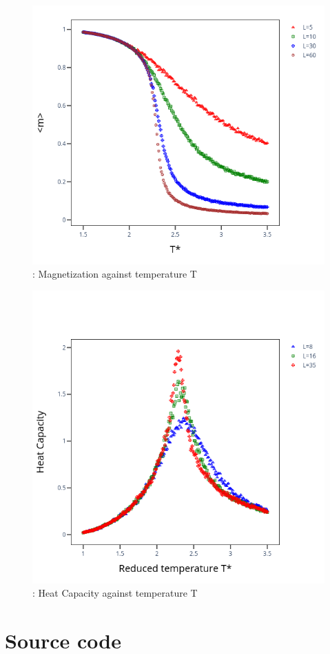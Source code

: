 \documentclass[11pt]{article}
\begin{document}
    \begin{figure}[H]
        \centering
        \includegraphics[width=0.75\linewidth]{img/magnetisation}
        \caption{: Magnetization against temperature T}
        \label{fig:fourth}
    \end{figure}

    \begin{figure}[H]
        \centering
        \includegraphics[width=0.75\linewidth]{img/heat}
        \caption{: Heat Capacity against temperature T}
        \label{fig:fifth}
    \end{figure}


    \section{Source code}
    \label{sec:code}
\end{document}
